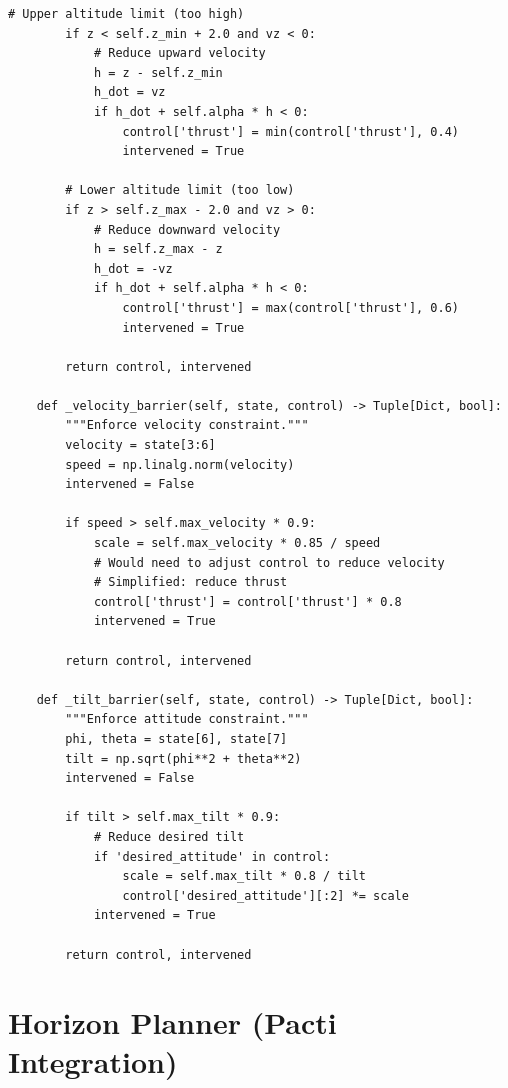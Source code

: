 \begin{lstlisting}[caption={CBF safety filter (cbf\_filter.py)}, label=lst:cbf]
        # Upper altitude limit (too high)
        if z < self.z_min + 2.0 and vz < 0:
            # Reduce upward velocity
            h = z - self.z_min
            h_dot = vz
            if h_dot + self.alpha * h < 0:
                control['thrust'] = min(control['thrust'], 0.4)
                intervened = True

        # Lower altitude limit (too low)
        if z > self.z_max - 2.0 and vz > 0:
            # Reduce downward velocity
            h = self.z_max - z
            h_dot = -vz
            if h_dot + self.alpha * h < 0:
                control['thrust'] = max(control['thrust'], 0.6)
                intervened = True

        return control, intervened

    def _velocity_barrier(self, state, control) -> Tuple[Dict, bool]:
        """Enforce velocity constraint."""
        velocity = state[3:6]
        speed = np.linalg.norm(velocity)
        intervened = False

        if speed > self.max_velocity * 0.9:
            scale = self.max_velocity * 0.85 / speed
            # Would need to adjust control to reduce velocity
            # Simplified: reduce thrust
            control['thrust'] = control['thrust'] * 0.8
            intervened = True

        return control, intervened

    def _tilt_barrier(self, state, control) -> Tuple[Dict, bool]:
        """Enforce attitude constraint."""
        phi, theta = state[6], state[7]
        tilt = np.sqrt(phi**2 + theta**2)
        intervened = False

        if tilt > self.max_tilt * 0.9:
            # Reduce desired tilt
            if 'desired_attitude' in control:
                scale = self.max_tilt * 0.8 / tilt
                control['desired_attitude'][:2] *= scale
            intervened = True

        return control, intervened
\end{lstlisting}

\section{Horizon Planner (Pacti Integration)}

